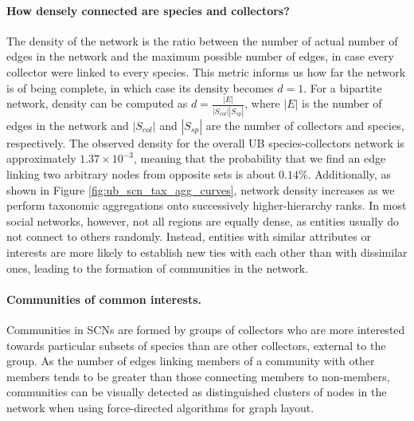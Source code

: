 \paragraph{How densely connected are species and collectors?}
The density of the network is the ratio between the number of actual number of edges in the network and the maximum possible number of edges, in case every collector were linked to every species. This metric informs us how far the network is of being complete, in which case its density becomes $d=1$. For a bipartite network, density can be computed as $d = \frac{|E|}{|S_{col}| |S_{sp}|}$, where $|E|$ is the number of edges in the network and $|S_{col}|$ and $|S_{sp}|$ are the number of collectors and species, respectively.
%
The observed density for the overall UB species-collectors network is approximately $1.37 \times 10^{-3}$, meaning that the probability that we find an edge linking two arbitrary nodes from opposite sets is about $0.14\%$. Additionally, as shown in Figure \ref{fig:ub_scn_tax_agg_curves}, network density increases as we perform taxonomic aggregations onto successively higher-hierarchy ranks.
%
In most social networks, however, not all regions are equally dense, as entities usually do not connect to others randomly. Instead, entities with similar attributes or interests are more likely to establish new ties with each other than with dissimilar ones, leading to the formation of communities in the network.


\paragraph{Communities of common interests.}
Communities in SCNs are formed by groups of collectors who are more interested towards particular subsets of species than are other collectors, external to the group.
As the number of edges linking members of a community with other members tends to be greater than those connecting members to non-members, communities can be visually detected as distinguished clusters of nodes in the network when using force-directed algorithms \cite{Jacomy2014} for graph layout.


